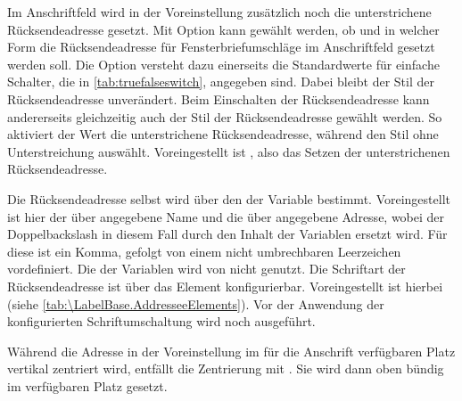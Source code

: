 Im Anschriftfeld wird in der Voreinstellung 
zusätzlich noch die unterstrichene Rücksendeadresse gesetzt.  Mit Option
 kann gewählt werden, ob und in welcher Form die
Rücksendeadresse für
Fensterbriefumschläge im Anschriftfeld gesetzt werden soll.  Die
Option versteht dazu einerseits
die Standardwerte für einfache Schalter, die in \autoref{tab:truefalseswitch},
 angegeben sind. Dabei bleibt der Stil der
Rücksendeadresse unverändert. Beim Einschalten der Rücksendeadresse kann
andererseits gleichzeitig auch der Stil der
Rücksendeadresse gewählt werden. So aktiviert der Wert
 die
unterstrichene Rücksendeadresse, während
 den Stil ohne
Unterstreichung auswählt. Voreingestellt ist
, also das Setzen der unterstrichenen Rücksendeadresse.

Die Rücksendeadresse selbst wird über den  der Variable
 bestimmt. Voreingestellt ist hier der über
 angegebene Name und die über
 angegebene Adresse, wobei der
Doppelbackslash in diesem Fall durch den Inhalt der Variablen
 ersetzt wird. Für diese ist ein Komma, gefolgt
von einem nicht umbrechbaren Leerzeichen vordefiniert. Die 
der Variablen  wird von \KOMAScript{} nicht genutzt.
\BeginIndexGroup{}%
%
Die Schriftart der Rücksendeadresse ist über das Element
konfigurierbar. Voreingestellt ist hierbei  (siehe
\autoref{tab:\LabelBase.AddresseeElements}). Vor der Anwendung der
konfigurierten Schriftumschaltung wird noch  ausgeführt.%
\EndIndexGroup

Während die Adresse in der Voreinstellung
 im für die Anschrift verfügbaren Platz vertikal
zentriert wird, entfällt die Zentrierung mit
%
. Sie wird dann oben bündig im
verfügbaren Platz gesetzt.

